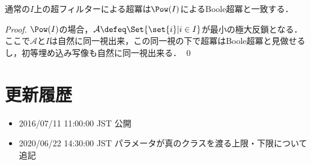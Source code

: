 \documentclass[a4j]{ltjsarticle}
\renewcommand{\emph}[1]{\textbf{\textgt{#1}}}
\begin{document}
\begin{theorem}
 通常の$I$上の超フィルターによる超冪は$\Pow(I)$によるBoole超冪と一致する．
\end{theorem}
\begin{proof}
 $\Pow(I)$の場合，$\mathcal{A} \defeq \Set{\set{i} | i \in I}$が最小の極大反鎖となる．
 ここで$\mathcal{A}$と$I$は自然に同一視出来，この同一視の下で超冪はBoole超冪と見做せるし，初等埋め込み写像も自然に同一視出来る． \qed
\end{proof}

\section{更新履歴}
\begin{itemize}
  \item 2016/07/11 11:00:00 JST 公開
  \item 2020/06/22 14:30:00 JST パラメータが真のクラスを渡る上限・下限について追記
\end{itemize}

\renewcommand{\emph}[1]{\textsf{\textgt{#1}}}
\nocite{Hamkins:2012qv,Jech:2002,Kunen:2011,Kamo:2007,Shioya:2014fr}
\printbibliography[title=参考文献]
\end{document}
